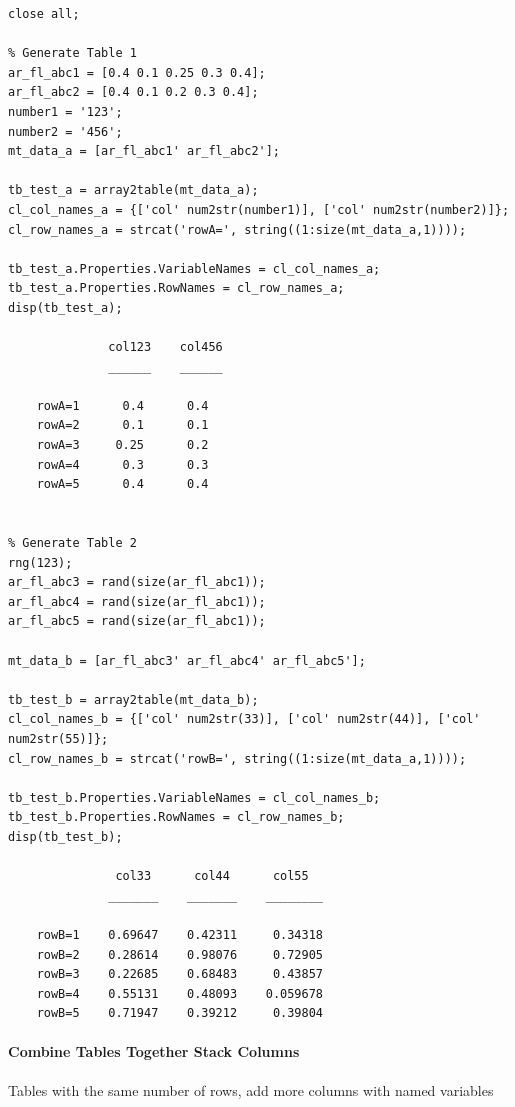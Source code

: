 \documentclass[
]{book}
\begin{document}
\begin{verbatim}
close all;

% Generate Table 1
ar_fl_abc1 = [0.4 0.1 0.25 0.3 0.4];
ar_fl_abc2 = [0.4 0.1 0.2 0.3 0.4];
number1 = '123';
number2 = '456';
mt_data_a = [ar_fl_abc1' ar_fl_abc2'];

tb_test_a = array2table(mt_data_a);
cl_col_names_a = {['col' num2str(number1)], ['col' num2str(number2)]};
cl_row_names_a = strcat('rowA=', string((1:size(mt_data_a,1))));

tb_test_a.Properties.VariableNames = cl_col_names_a;
tb_test_a.Properties.RowNames = cl_row_names_a;
disp(tb_test_a);

              col123    col456
              ______    ______

    rowA=1      0.4      0.4  
    rowA=2      0.1      0.1  
    rowA=3     0.25      0.2  
    rowA=4      0.3      0.3  
    rowA=5      0.4      0.4  


% Generate Table 2
rng(123);
ar_fl_abc3 = rand(size(ar_fl_abc1));
ar_fl_abc4 = rand(size(ar_fl_abc1));
ar_fl_abc5 = rand(size(ar_fl_abc1));

mt_data_b = [ar_fl_abc3' ar_fl_abc4' ar_fl_abc5'];

tb_test_b = array2table(mt_data_b);
cl_col_names_b = {['col' num2str(33)], ['col' num2str(44)], ['col' num2str(55)]};
cl_row_names_b = strcat('rowB=', string((1:size(mt_data_a,1))));

tb_test_b.Properties.VariableNames = cl_col_names_b;
tb_test_b.Properties.RowNames = cl_row_names_b;
disp(tb_test_b);

               col33      col44      col55  
              _______    _______    ________

    rowB=1    0.69647    0.42311     0.34318
    rowB=2    0.28614    0.98076     0.72905
    rowB=3    0.22685    0.68483     0.43857
    rowB=4    0.55131    0.48093    0.059678
    rowB=5    0.71947    0.39212     0.39804
\end{verbatim}

\hypertarget{combine-tables-together-stack-columns}{%
\paragraph{Combine Tables Together Stack Columns}\label{combine-tables-together-stack-columns}}

Tables with the same number of rows, add more columns with named
variables
\end{document}
